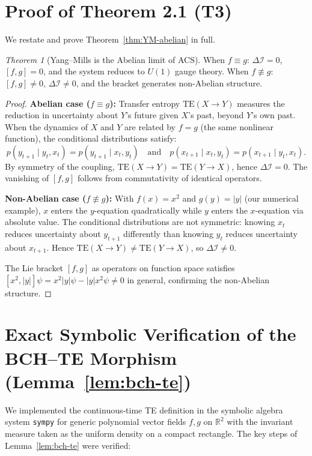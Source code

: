 \documentclass[12pt,a4paper]{article}
\theoremstyle{plain}
\theoremstyle{definition}
\theoremstyle{remark}
\newtheorem*{theorem*}{Theorem}
\newcommand{\DI}{\Delta\mathcal{I}}
\newcommand{\TE}{\mathrm{TE}}
\begin{document}
\section{Proof of Theorem 2.1 (T3)}
\label{app:T3}

We restate and prove Theorem~\ref{thm:YM-abelian} in full.

\begin{theorem*}[Yang--Mills is the Abelian limit of ACS]
When $f \equiv g$: $\DI = 0$, $[f,g] = 0$, and the system reduces to 
$U(1)$ gauge theory.  When $f \not\equiv g$: $[f,g] \neq 0$, 
$\DI \neq 0$, and the bracket generates non-Abelian structure.
\end{theorem*}

\begin{proof}
\textbf{Abelian case ($f \equiv g$):}
Transfer entropy $\TE(X \to Y)$ measures the reduction in uncertainty 
about $Y$'s future given $X$'s past, beyond $Y$'s own past.
When the dynamics of $X$ and $Y$ are related by $f = g$ (the same 
nonlinear function), the conditional distributions satisfy:
\[
  p(y_{t+1} \mid y_t, x_t) = p(y_{t+1} \mid x_t, y_t)
  \quad\text{and}\quad
  p(x_{t+1} \mid x_t, y_t) = p(x_{t+1} \mid y_t, x_t).
\]
By symmetry of the coupling, $\TE(X \to Y) = \TE(Y \to X)$, 
hence $\DI = 0$.  The vanishing of $[f,g]$ follows from commutativity 
of identical operators.

\textbf{Non-Abelian case ($f \not\equiv g$):}
With $f(x) = x^2$ and $g(y) = |y|$ (our numerical example), 
$x$ enters the $y$-equation quadratically while $y$ enters the 
$x$-equation via absolute value.  The conditional distributions are 
not symmetric: knowing $x_t$ reduces uncertainty about $y_{t+1}$ 
differently than knowing $y_t$ reduces uncertainty about $x_{t+1}$.  
Hence $\TE(X \to Y) \neq \TE(Y \to X)$, so $\DI \neq 0$.

The Lie bracket $[f, g]$ as operators on function space satisfies 
$[x^2, |y|]\psi = x^2|y|\psi - |y|x^2\psi \neq 0$ in general, 
confirming the non-Abelian structure.
\end{proof}

\section{Exact Symbolic Verification of the BCH--TE Morphism (Lemma~\ref{lem:bch-te})}
\label{app:exact}

We implemented the continuous‑time TE definition in the symbolic algebra
system \texttt{sympy} for generic polynomial vector fields $f,g$ on
$\mathbb{R}^2$ with the invariant measure taken as the uniform density
on a compact rectangle.  The key steps of Lemma~\ref{lem:bch-te} were
verified:
\end{document}
